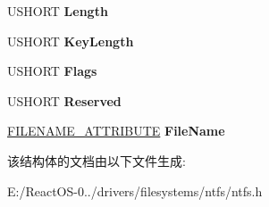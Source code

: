 \begin{DoxyCompactItemize}
\begin{tabbing}
\end{tabbing}\item 
\mbox{\label{struct_i_n_d_e_x___e_n_t_r_y___a_t_t_r_i_b_u_t_e_a530b64f74e98f147163ed900c5835855}} 
U\+S\+H\+O\+RT {\bfseries Length}
\item 
\mbox{\label{struct_i_n_d_e_x___e_n_t_r_y___a_t_t_r_i_b_u_t_e_a61421659b036f2f62fe3bde546d7f7d2}} 
U\+S\+H\+O\+RT {\bfseries Key\+Length}
\item 
\mbox{\label{struct_i_n_d_e_x___e_n_t_r_y___a_t_t_r_i_b_u_t_e_ad599aa8745b6df275283930efccb6d1d}} 
U\+S\+H\+O\+RT {\bfseries Flags}
\item 
\mbox{\label{struct_i_n_d_e_x___e_n_t_r_y___a_t_t_r_i_b_u_t_e_a6899c4b7eb4f23ac52d7c3471594c643}} 
U\+S\+H\+O\+RT {\bfseries Reserved}
\item 
\mbox{\label{struct_i_n_d_e_x___e_n_t_r_y___a_t_t_r_i_b_u_t_e_a4f13a95533badf278ff7c6e3020fd9ba}} 
\hyperlink{struct_f_i_l_e_n_a_m_e___a_t_t_r_i_b_u_t_e}{F\+I\+L\+E\+N\+A\+M\+E\+\_\+\+A\+T\+T\+R\+I\+B\+U\+TE} {\bfseries File\+Name}
\end{DoxyCompactItemize}


该结构体的文档由以下文件生成\+:\begin{DoxyCompactItemize}
\item 
E\+:/\+React\+O\+S-\/0../drivers/filesystems/ntfs/ntfs.\+h\end{DoxyCompactItemize}
